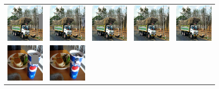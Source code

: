 \begin{figure}[h!]
\centering
\small
\begin{tabular}{ccccc}
\includegraphics[width=.2\textwidth]{figures/conv/000000188439_input_image.png}&
\includegraphics[width=.2\textwidth]{figures/conv/000000188439_synthesized_image.png}&
\includegraphics[width=.2\textwidth]{figures/conv/000000188439_synthesized_image-0.png}&
\includegraphics[width=.2\textwidth]{figures/conv/000000188439_synthesized_image-1.png}&
\includegraphics[width=.2\textwidth]{figures/conv/000000188439_synthesized_image.jpg}\\
\includegraphics[width=.2\textwidth]{figures/conv/000000311303_input_image.png}&
\includegraphics[width=.2\textwidth]{figures/conv/000000311303_synthesized_image.png}&

\end{tabular}
\end{figure}
